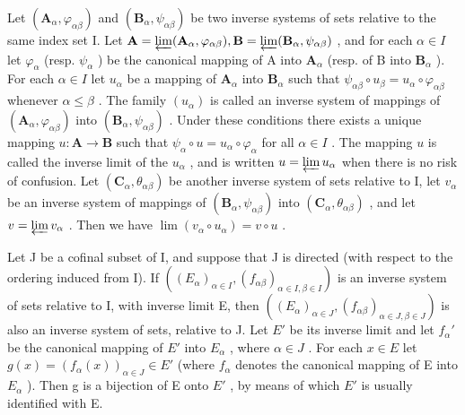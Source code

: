Let \((\mathbf{A}_{\alpha},\varphi_{\alpha \beta})\) and \((\mathbf{B}_{\alpha},\psi_{\alpha \beta})\) be two inverse systems of sets relative to the same index set I. Let \(\mathbf{A} = \varprojlim (\mathbf{A}_{\alpha},\varphi_{\alpha \beta}),\mathbf{B} = \varprojlim (\mathbf{B}_{\alpha},\psi_{\alpha \beta})\) , and for each \(\alpha \in I\) let \(\varphi_{\alpha}\) (resp. \(\psi_{\alpha}\) ) be the canonical mapping of A into \(\mathbf{A}_{\alpha}\) (resp. of B into \(\mathbf{B}_{\alpha}\) ). For each \(\alpha \in I\) let \(u_{\alpha}\) be a mapping of \(\mathbf{A}_{\alpha}\) into \(\mathbf{B}_{\alpha}\) such that \(\psi_{\alpha \beta}\circ u_{\beta} = u_{\alpha}\circ \varphi_{\alpha \beta}\) whenever \(\alpha \leqslant \beta\) . The family \((u_{\alpha})\) is called an inverse system of mappings of \((\mathbf{A}_{\alpha},\varphi_{\alpha \beta})\) into \((\mathbf{B}_{\alpha},\psi_{\alpha \beta})\) . Under these conditions there exists a unique mapping \(u:\mathbf{A}\to \mathbf{B}\) such that \(\psi_{\alpha}\circ u = u_{\alpha}\circ \varphi_{\alpha}\) for all \(\alpha \in I\) . The mapping \(u\) is called the inverse limit of the \(u_{\alpha}\) , and is written \(u = \varprojlim u_{\alpha}\) when there is no risk of confusion. Let \((\mathbf{C}_{\alpha}, \theta_{\alpha\beta})\) be another inverse system of sets relative to I, let \(v_{\alpha}\) be an inverse system of mappings of \((\mathbf{B}_{\alpha}, \psi_{\alpha\beta})\) into \((\mathbf{C}_{\alpha}, \theta_{\alpha\beta})\) , and let \(v = \varprojlim v_{\alpha}\) . Then we have \(\lim (v_{\alpha} \circ u_{\alpha}) = v \circ u\) .

Let J be a cofinal subset of I, and suppose that J is directed (with respect to the ordering induced from I). If \(((E_{\alpha})_{\alpha\in I}, (f_{\alpha\beta})_{\alpha\in I,\beta\in I})\) is an inverse system of sets relative to I, with inverse limit E, then \(((E_{\alpha})_{\alpha\in J}, (f_{\alpha\beta})_{\alpha\in J,\beta\in J})\) is also an inverse system of sets, relative to J. Let \(E'\) be its inverse limit and let \(f_{\alpha}'\) be the canonical mapping of \(E'\) into \(E_{\alpha}\) , where \(\alpha\in J\) . For each \(x\in E\) let \(g(x)=(f_{\alpha}(x))_{\alpha\in J}\in E'\) (where \(f_{\alpha}\) denotes the canonical mapping of E into \(E_{\alpha}\) ). Then g is a bijection of E onto \(E'\) , by means of which \(E'\) is usually identified with E.

